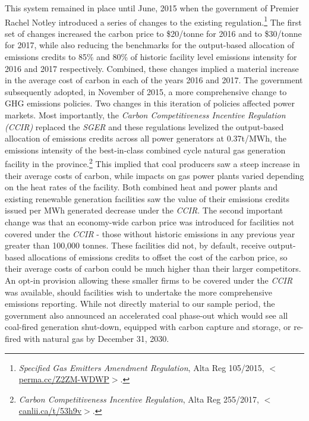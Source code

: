 \documentclass[12pt]{article}
\begin{document}
This system remained in place until June, 2015 when the government of Premier Rachel Notley introduced a series of changes to the existing regulation.\footnote{\textit{Specified Gas Emitters Amendment Regulation}, Alta Reg 105/2015, $<$\url{perma.cc/Z2ZM-WDWP}$>$.} The first set of changes increased the carbon price to \$20/tonne for 2016 and to \$30/tonne for 2017, while also reducing the benchmarks for the output-based allocation of emissions credits to 85\% and 80\% of historic facility level emissions intensity for 2016 and 2017 respectively. Combined, these changes implied a material increase in the average cost of carbon in each of the years 2016 and 2017. The government subsequently adopted, in November of 2015, a more comprehensive change to GHG emissions policies. Two changes in this iteration of policies affected power markets.  Most importantly, the \textit{Carbon Competitiveness Incentive Regulation (CCIR)} replaced the \emph{SGER} and these regulations levelized the output-based allocation of emissions credits across all power generators at 0.37t/MWh, the emissions intensity of the best-in-class combined cycle natural gas generation facility in the province.\footnote{\textit{Carbon Competitiveness Incentive Regulation}, Alta Reg 255/2017, $<$\url{canlii.ca/t/53h9v}$>$.} This implied that coal producers saw a steep increase in their average costs of carbon, while impacts on gas power plants varied depending on the heat rates of the facility. Both combined heat and power plants and existing renewable generation facilities saw the value of their emissions credits issued per MWh generated decrease under the \emph{CCIR}. The second important change was that an economy-wide carbon price was introduced for facilities not covered under the \emph{CCIR} - those without historic emissions in any previous year greater than 100,000 tonnes. These facilities did not, by default, receive output-based allocations of emissions credits to offset the cost of the carbon price, so their average costs of carbon could be much higher than their larger competitors.  An opt-in provision allowing these smaller firms to be covered under the \emph{CCIR} was available, should facilities wish to undertake the more comprehensive emissions reporting. While not directly material to our sample period, the government also announced an accelerated coal phase-out which would see all coal-fired generation shut-down, equipped with carbon capture and storage, or re-fired with natural gas by December 31, 2030.
\end{document}
